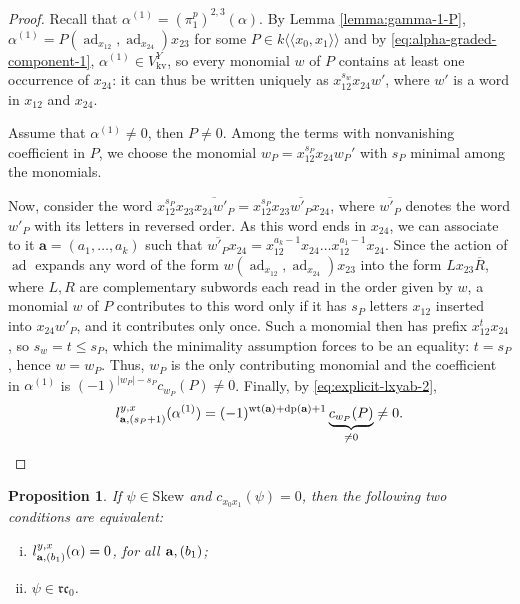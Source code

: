 \documentclass[a4paper,fleqn]{cas-sc}
\newtheorem{proposition}[theorem]{Proposition}
\DeclareMathOperator{\dpt}{dp}
\DeclareMathOperator{\ad}{ad}
\DeclareMathOperator{\kv}{kv}
\DeclareMathOperator{\wt}{wt}
\begin{document}
\begin{proof}
Recall that $\alpha^{(1)}=(\pi^p_1)^{2,3}(\alpha)$. By Lemma \ref{lemma:gamma-1-P}, $\alpha^{(1)}=P(\ad_{x_{12}}, \ad_{x_{24}})x_{23}$ for some $P \in k\langle \langle x_0, x_1 \rangle \rangle$ and by \eqref{eq:alpha-graded-component-1}, $\alpha^{(1)} \in V^Y_{\kv}$, so every monomial $w$ of $P$ contains at least one occurrence of $x_{24}$: it can thus be written uniquely as $x_{12}^{s_w}x_{24}w'$, where $w'$ is a word in $x_{12}$ and $x_{24}$. 

Assume that $\alpha^{(1)} \neq 0$, then $P \neq 0$. Among the terms with nonvanishing coefficient in $P$, we choose the monomial $w_P = x_{12}^{s_P} x_{24} w_P'$ with $s_P$ minimal among the monomials.

Now, consider the word $x_{12}^{s_P}x_{23}\overline{x_{24}w'_P} = x_{12}^{s_P}x_{23}\overline{w'_P}x_{24}$, where $\overline{w'_P}$ denotes the word $w'_P$ with its letters in reversed order. As this word ends in $x_{24}$, we can associate to it $\textbf{a} = (a_1, \ldots, a_k)$ such that $\overline{w'_P}x_{24} = x_{12}^{a_k-1}x_{24} \ldots x_{12}^{a_1-1}x_{24}$.
Since the action of $\ad$ expands any word of the form $w(\ad_{x_{12}}, \ad_{x_{24}})x_{23}$ into the form $L x_{23} \overline{R}$, where $L,R$ are complementary subwords each read in the order given by $w$, a monomial $w$ of $P$ contributes to this word only if it has $s_P$ letters $x_{12}$ inserted into $x_{24}w'_P$, and it contributes only once. Such a monomial then has prefix $x_{12}^tx_{24}$, so $s_w=t \leq s_P$, which the minimality assumption forces to be an equality: $t=s_P$, hence $w=w_P$. Thus, $w_P$ is the only contributing monomial and the coefficient in $\alpha^{(1)}$ is $(-1)^{\lvert w_P \rvert - s_P} c_{w_P}(P) \neq 0$.
Finally, by \eqref{eq:explicit-lxyab-2},
\begin{align*}
    l^{y,x}_{\bold{a},(s_P+1)}(\alpha^{(1)}) = (-1)^{\wt(\textbf{a})+\dpt(\textbf{a})+1} \underbrace{c_{w_P}(P)}_{\neq 0} \neq 0.
\end{align*}


\end{proof}

\begin{proposition}
\label{prop:one_leg}
If $\psi\in \mathrm{Skew}$ and $c_{x_0x_1}(\psi)=0$, then the following two conditions are equivalent:
\begin{enumerate}[(i)] %
    \item \label{prop:one_leg-1}
    $l^{y,x}_{\bold a,(b_1)}(\alpha)=0$, for all $\bold a, (b_1)$;
    \item \label{prop:one_leg-2}
    $\psi\in \mathfrak{rc}_0$.
\end{enumerate}
\end{proposition}
\end{document}
